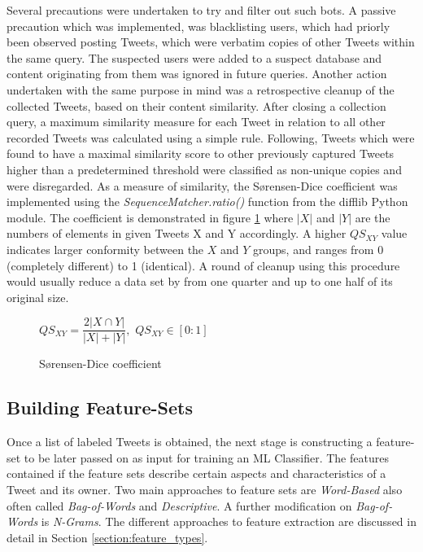 		\noindent
		Several precautions were undertaken to try and filter out such bots. A passive precaution which was implemented, was blacklisting users, which had priorly been observed posting Tweets, which were verbatim copies of other Tweets within the same query. The suspected users were added to a suspect database and content originating from them was ignored in future queries. Another action undertaken with the same purpose in mind was a retrospective cleanup of the collected Tweets, based on their content similarity. After closing a collection query, a maximum similarity measure for each Tweet in relation to all other recorded Tweets was calculated using a simple rule. Following, Tweets which were found to have a maximal similarity score to other previously captured Tweets  higher than a predetermined threshold were classified as non-unique copies and were disregarded. As a measure of similarity, the S\o rensen-Dice coefficient \cite{sorensen1948method} was implemented  using the \textit{SequenceMatcher.ratio()} function from the difflib Python module. The coefficient is demonstrated in figure \ref{fig:sorenson_dice} where $|X|$ and $|Y|$ are the numbers of elements in given Tweets X and Y accordingly. A higher $ QS_{XY} $ value indicates larger conformity between the $ X $ and $ Y $ groups, and ranges from 0 (completely different) to 1 (identical). A round of cleanup using this procedure would usually reduce a data set by from one quarter and up to one half of its original size.
		
		\begin{figure}[h]
			\begin{center}
				$QS_{XY} = \dfrac{2|X\cap Y|}{|X|+|Y|},$ \hspace{10pt}  $QS_{XY} \in [0:1]$
			\end{center}
			\caption{S\o rensen-Dice coefficient}
			\label{fig:sorenson_dice}
		\end{figure}
		
	\subsection{Building Feature-Sets}
	\label{build_features}
	Once a list of labeled Tweets is obtained, the next stage is constructing a feature-set to be later passed on as input for training an ML Classifier. The features contained if the feature sets describe certain aspects and characteristics of a Tweet and its owner. Two main approaches to feature sets are \textit{Word-Based} also often called \textit{Bag-of-Words} and \textit{Descriptive}. A further modification on \textit{Bag-of-Words} is \textit{N-Grams}. The different approaches to feature extraction are discussed in detail in Section \ref{section:feature_types}.
	
